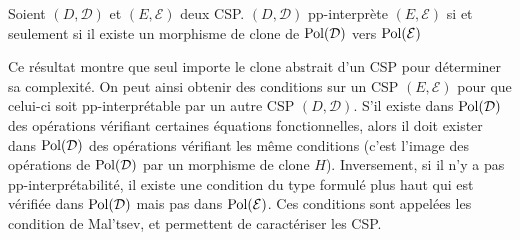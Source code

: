 \begin{theo}{}
    Soient $(D,\mathcal{D})$ et $(E,\mathcal{E})$ deux CSP.  $(D,\mathcal{D})$
    pp-interprète  $(E,\mathcal{E})$ si et seulement si il existe un morphisme
    de clone de $\text{Pol}(\mathcal{D})$ vers $\text{Pol}(\mathcal{E})$
\end{theo}

Ce résultat montre que seul importe le clone abstrait d'un CSP pour déterminer
sa complexité. On peut ainsi obtenir des conditions sur un CSP
$(E,\mathcal{E})$ pour que celui-ci soit pp-interprétable par un autre CSP
$(D,\mathcal{D})$. S'il existe dans $\text{Pol}(\mathcal{D})$ des opérations
vérifiant certaines équations fonctionnelles, alors il doit exister dans
$\text{Pol}(\mathcal{D})$ des opérations vérifiant les même conditions (c'est l'image
des opérations de $\text{Pol}(\mathcal{D})$ par un morphisme de clone $H$).
Inversement, si il n'y a pas pp-interprétabilité, il existe une condition du
type formulé plus haut qui est vérifiée dans $\text{Pol}(\mathcal{D})$ mais pas dans
$\text{Pol}(\mathcal{E})$. Ces conditions sont appelées les condition de Mal'tsev, et
permettent de caractériser les CSP.

